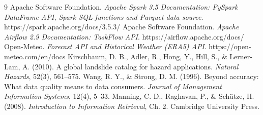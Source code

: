 \documentclass[11pt,a4paper]{article}
\begin{document}
\begin{thebibliography}{9}\small
{} Apache Software Foundation. \textit{Apache Spark 3.5 Documentation: PySpark DataFrame API, Spark SQL functions and Parquet data source}. https://spark.apache.org/docs/3.5.3/
 Apache Software Foundation. \textit{Apache Airflow 2.9 Documentation: TaskFlow API}. https://airflow.apache.org/docs/
 Open-Meteo. \textit{Forecast API and Historical Weather (ERA5) API}. https://open-meteo.com/en/docs
 Kirschbaum, D. B., Adler, R., Hong, Y., Hill, S., \& Lerner-Lam, A. (2010). A global landslide catalog for hazard applications. \textit{Natural Hazards}, 52(3), 561--575.
 Wang, R. Y., \& Strong, D. M. (1996). Beyond accuracy: What data quality means to data consumers. \textit{Journal of Management Information Systems}, 12(4), 5--33.
 Manning, C. D., Raghavan, P., \& Schütze, H. (2008). \textit{Introduction to Information Retrieval}, Ch. 2. Cambridge University Press.
\end{thebibliography}
\end{document}
